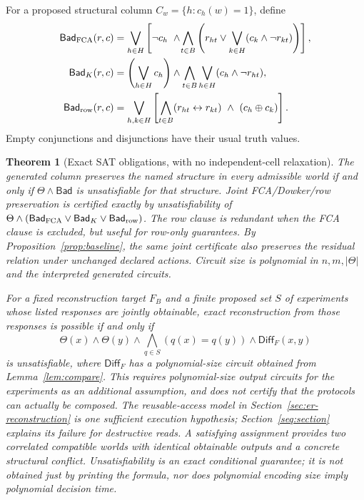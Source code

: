 \documentclass[11pt]{article}
\newtheorem{theorem}{Theorem}[section]
\theoremstyle{definition}
\begin{document}
For a proposed structural column $C_w=\{h:c_h(w)=1\}$, define
\begin{align*}
 \mathsf{Bad}_{\rm FCA}(r,c)
 &=\bigvee_{h\in H}\left[\neg c_h\ \wedge\!
 \bigwedge_{t\in B}\left(r_{ht}\vee\bigvee_{k\in H}(c_k\wedge\neg r_{kt})\right)\right],\\
 \mathsf{Bad}_{K}(r,c)
 &=\left(\bigvee_{h\in H}c_h\right)\wedge
 \bigwedge_{t\in B}\bigvee_{h\in H}(c_h\wedge\neg r_{ht}),\\
 \mathsf{Bad}_{\rm row}(r,c)
 &=\bigvee_{h,k\in H}\left[
 \bigwedge_{t\in B}(r_{ht}\leftrightarrow r_{kt})\ \wedge\ (c_h\mathbin\oplus c_k)\right].
\end{align*}
Empty conjunctions and disjunctions have their usual truth values.

\begin{theorem}[Exact SAT obligations, with no independent-cell relaxation]\label{thm:sat}
The generated column preserves the named structure in every admissible world if and only if $\Theta\wedge\mathsf{Bad}$ is unsatisfiable for that structure. Joint FCA/Dowker/row preservation is certified exactly by unsatisfiability of $\Theta\wedge(\mathsf{Bad}_{\rm FCA}\vee\mathsf{Bad}_K\vee\mathsf{Bad}_{\rm row})$. The row clause is redundant when the FCA clause is excluded, but useful for row-only guarantees. By Proposition~\ref{prop:baseline}, the same joint certificate also preserves the residual relation under unchanged declared actions. Circuit size is polynomial in $n,m,|\Theta|$ and the interpreted generated circuits.

For a fixed reconstruction target $F_B$ and a finite proposed set $S$ of experiments whose listed responses are jointly obtainable, exact reconstruction from those responses is possible if and only if
\[
 \Theta(x)\wedge\Theta(y)\wedge
 \bigwedge_{q\in S}(q(x)=q(y))\wedge\mathsf{Diff}_F(x,y) \tag{E5}
\]
is unsatisfiable, where $\mathsf{Diff}_F$ has a polynomial-size circuit obtained from Lemma~\ref{lem:compare}. This requires polynomial-size output circuits for the experiments as an additional assumption, and does not certify that the protocols can actually be composed. The reusable-access model in Section~\ref{sec:er-reconstruction} is one sufficient execution hypothesis; Section~\ref{seq:section} explains its failure for destructive reads. A satisfying assignment provides two correlated compatible worlds with identical obtainable outputs and a concrete structural conflict. Unsatisfiability is an exact conditional guarantee; it is not obtained just by printing the formula, nor does polynomial encoding size imply polynomial decision time.
\end{theorem}
\end{document}
